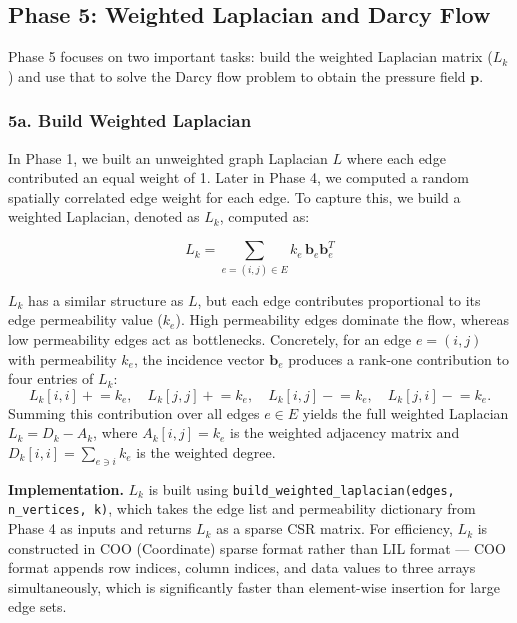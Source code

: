 \documentclass[a4paper,12pt]{amsart}
\numberwithin{equation}{section}
\begin{document}
\subsection{Phase 5: Weighted Laplacian and Darcy Flow}

Phase 5 focuses on two important tasks: build the weighted Laplacian 
matrix ($L_k$) and use that to solve the Darcy flow problem to obtain 
the pressure field $\mathbf{p}$.

\subsubsection{5a. Build Weighted Laplacian}

In Phase 1, we built an unweighted graph Laplacian $L$ where each edge 
contributed an equal weight of 1. Later in Phase 4, we computed a 
random spatially correlated edge weight for each edge. To capture 
this, we build a weighted Laplacian, denoted as $L_k$, computed as:

\begin{equation}
L_k = \sum_{e = (i,j) \in E} k_e \, \mathbf{b}_e \mathbf{b}_e^T
\end{equation}

$L_k$ has a similar structure as $L$, but each edge contributes 
proportional to its edge permeability value ($k_e$). High permeability 
edges dominate the flow, whereas low permeability edges act as 
bottlenecks. Concretely, for an edge $e = (i,j)$ with 
permeability $k_e$, the incidence vector $\mathbf{b}_e$ produces 
a rank-one contribution to four entries of $L_k$:
\begin{equation}
L_k[i,i] \mathrel{+}= k_e, \quad
L_k[j,j] \mathrel{+}= k_e, \quad
L_k[i,j] \mathrel{-}= k_e, \quad
L_k[j,i] \mathrel{-}= k_e.
\end{equation}
Summing this contribution over all edges $e \in E$ yields the full 
weighted Laplacian $L_k = D_k - A_k$, where $A_k[i,j] = k_e$ is the 
weighted adjacency matrix and $D_k[i,i] = \sum_{e \ni i} k_e$ is the 
weighted degree. 

\textbf{Implementation.} $L_k$ is built using 
\texttt{build\_weighted\_laplacian(edges, n\_vertices, k)}, which takes 
the edge list and permeability dictionary from Phase 4 as inputs and 
returns $L_k$ as a sparse CSR matrix. For efficiency, $L_k$ is 
constructed in COO (Coordinate) sparse format rather than LIL format 
— COO format appends row indices, column indices, and data values to 
three arrays simultaneously, which is significantly faster than 
element-wise insertion for large edge sets.
\end{document}
